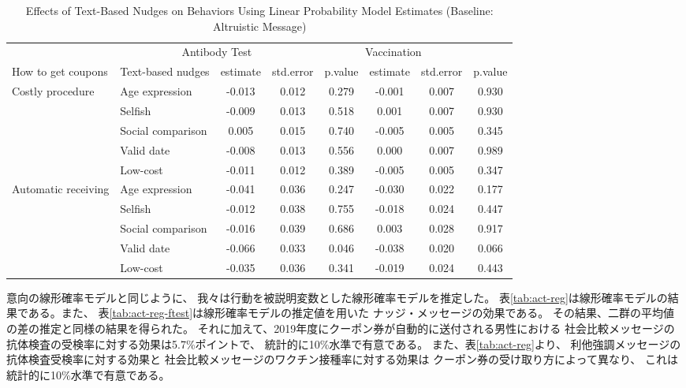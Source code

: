 \documentclass[
  11pt,
  a4paper,
]{article}
\begin{document}
\begin{table}

\caption{\label{tab:act-reg-ftest2}Effects of Text-Based Nudges on Behaviors Using Linear Probability Model Estimates (Baseline: Altruistic Message)}
\centering
\begin{tabular}[t]{>{\raggedright\arraybackslash}p{5em}lcccccc}
\toprule
\multicolumn{2}{c}{ } & \multicolumn{3}{c}{Antibody Test} & \multicolumn{3}{c}{Vaccination} \\
\cmidrule(l{3pt}r{3pt}){3-5} \cmidrule(l{3pt}r{3pt}){6-8}
How to get coupons & Text-based nudges & estimate & std.error & p.value & estimate  & std.error  & p.value \\
\midrule
Costly procedure & Age expression & -0.013 & 0.012 & 0.279 & -0.001 & 0.007 & 0.930\\
 & Selfish & -0.009 & 0.013 & 0.518 & 0.001 & 0.007 & 0.930\\
 & Social comparison & 0.005 & 0.015 & 0.740 & -0.005 & 0.005 & 0.345\\
 & Valid date & -0.008 & 0.013 & 0.556 & 0.000 & 0.007 & 0.989\\
 & Low-cost & -0.011 & 0.012 & 0.389 & -0.005 & 0.005 & 0.347\\
Automatic receiving & Age expression & -0.041 & 0.036 & 0.247 & -0.030 & 0.022 & 0.177\\
 & Selfish & -0.012 & 0.038 & 0.755 & -0.018 & 0.024 & 0.447\\
 & Social comparison & -0.016 & 0.039 & 0.686 & 0.003 & 0.028 & 0.917\\
 & Valid date & -0.066 & 0.033 & 0.046 & -0.038 & 0.020 & 0.066\\
 & Low-cost & -0.035 & 0.036 & 0.341 & -0.019 & 0.024 & 0.443\\
\bottomrule
\end{tabular}
\end{table}

意向の線形確率モデルと同じように、
我々は行動を被説明変数とした線形確率モデルを推定した。
表\ref{tab:act-reg}は線形確率モデルの結果である。また、
表\ref{tab:act-reg-ftest}は線形確率モデルの推定値を用いた
ナッジ・メッセージの効果である。
その結果、二群の平均値の差の推定と同様の結果を得られた。
それに加えて、2019年度にクーポン券が自動的に送付される男性における
社会比較メッセージの抗体検査の受検率に対する効果は5.7\%ポイントで、
統計的に10\%水準で有意である。
また、表\ref{tab:act-reg}より、
利他強調メッセージの抗体検査受検率に対する効果と
社会比較メッセージのワクチン接種率に対する効果は
クーポン券の受け取り方によって異なり、
これは統計的に10\%水準で有意である。
\end{document}
